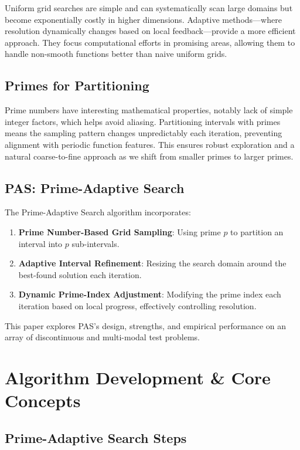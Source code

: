 \documentclass[10pt,twocolumn,letterpaper]{article}
\begin{document}
Uniform grid searches are simple and can systematically scan large domains but become exponentially costly in higher dimensions. Adaptive methods—where resolution dynamically changes based on local feedback—provide a more efficient approach. They focus computational efforts in promising areas, allowing them to handle non-smooth functions better than naive uniform grids.

\subsection{Primes for Partitioning}

Prime numbers have interesting mathematical properties, notably lack of simple integer factors, which helps avoid aliasing. Partitioning intervals with primes means the sampling pattern changes unpredictably each iteration, preventing alignment with periodic function features. This ensures robust exploration and a natural coarse-to-fine approach as we shift from smaller primes to larger primes.

\subsection{PAS: Prime-Adaptive Search}

The Prime-Adaptive Search algorithm incorporates:
\begin{enumerate}
    \item \textbf{Prime Number-Based Grid Sampling}: Using prime $p$ to partition an interval into $p$ sub-intervals.
    \item \textbf{Adaptive Interval Refinement}: Resizing the search domain around the best-found solution each iteration.
    \item \textbf{Dynamic Prime-Index Adjustment}: Modifying the prime index each iteration based on local progress, effectively controlling resolution.
\end{enumerate}

This paper explores PAS's design, strengths, and empirical performance on an array of discontinuous and multi-modal test problems.

\section{Algorithm Development \& Core Concepts}

\subsection{Prime-Adaptive Search Steps}
\end{document}

